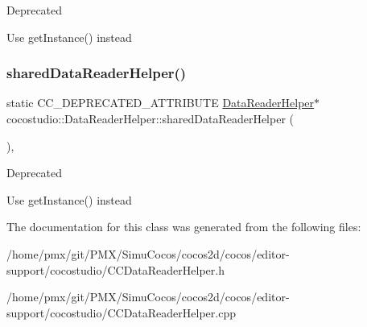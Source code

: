 \begin{DoxyRefDesc}{Deprecated}
\item[\hyperlink{deprecated__deprecated000079}{Deprecated}]Use get\+Instance() instead \end{DoxyRefDesc}
\mbox{\label{classcocostudio_1_1DataReaderHelper_a9bb0d6d948d46a153a1d7cfe53e3c406}} 
\subsubsection{\texorpdfstring{shared\+Data\+Reader\+Helper()}{sharedDataReaderHelper()}\hspace{0.1cm}{\footnotesize\ttfamily [2/2]}}
{\footnotesize\ttfamily static C\+C\+\_\+\+D\+E\+P\+R\+E\+C\+A\+T\+E\+D\+\_\+\+A\+T\+T\+R\+I\+B\+U\+TE \hyperlink{classcocostudio_1_1DataReaderHelper}{Data\+Reader\+Helper}$\ast$ cocostudio\+::\+Data\+Reader\+Helper\+::shared\+Data\+Reader\+Helper (\begin{DoxyParamCaption}{ }\end{DoxyParamCaption})\hspace{0.3cm}{\ttfamily [inline]}, {\ttfamily [static]}}

\begin{DoxyRefDesc}{Deprecated}
\item[\hyperlink{deprecated__deprecated000314}{Deprecated}]Use get\+Instance() instead \end{DoxyRefDesc}


The documentation for this class was generated from the following files\+:\begin{DoxyCompactItemize}
\item 
/home/pmx/git/\+P\+M\+X/\+Simu\+Cocos/cocos2d/cocos/editor-\/support/cocostudio/C\+C\+Data\+Reader\+Helper.\+h\item 
/home/pmx/git/\+P\+M\+X/\+Simu\+Cocos/cocos2d/cocos/editor-\/support/cocostudio/C\+C\+Data\+Reader\+Helper.\+cpp\end{DoxyCompactItemize}
